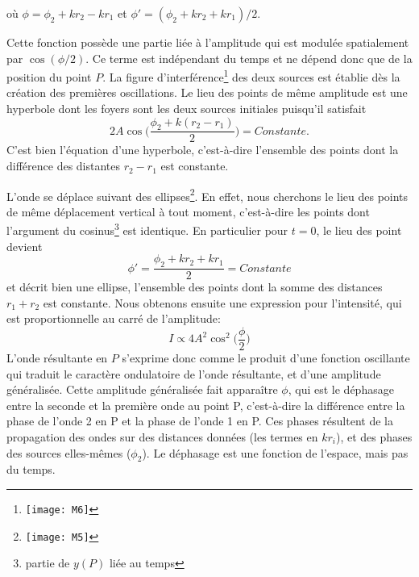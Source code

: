 où $\phi=\phi_2 +kr_2-kr_1$ et $\phi'=(\phi_2 +kr_2+kr_1)/2$.

Cette fonction possède une partie liée à l'amplitude qui est modulée spatialement par $\cos (\phi/2)$. Ce terme est indépendant du temps et ne dépend donc que de la position du point $P$. La figure d'interférence\footnote{
\texttt{[image: M6]}} des deux sources est établie dès la création des premières oscillations.
Le lieu des points de même amplitude est une hyperbole dont les foyers sont les deux sources initiales puisqu'il satisfait
$$2A\cos \Big(\frac{\phi_2 +k(r_2-r_1)}{2}\Big)=Constante.$$
C'est bien l'équation d'une hyperbole, c'est-à-dire l'ensemble des points dont la différence des distantes $r_2-r_1$ est constante.

L'onde se déplace suivant des ellipses\footnote{
\texttt{[image: M5]}}. En effet, nous cherchons le lieu des points de même déplacement vertical à tout moment, c'est-à-dire les points dont l'argument du cosinus\footnote{partie de $y(P)$ liée au temps} est identique.
En particulier pour $t=0$, le lieu des point devient
$$\phi'=\frac{\phi_2 +kr_2+kr_1}{2}=Constante$$ 
et décrit bien une ellipse, l'ensemble des points dont la somme des distances $r_1+r_2$ est constante.
Nous obtenons ensuite une expression pour l'intensité, qui est proportionnelle au carré de l'amplitude:
$$I\propto 4A^2\cos^2 \Big(\frac{\phi}{2}\Big)$$
L'onde résultante en $P$ s'exprime donc comme le produit d'une fonction oscillante qui traduit le caractère ondulatoire de l'onde résultante, et d'une amplitude généralisée. Cette amplitude généralisée fait apparaître $\phi$, qui est le déphasage entre la seconde et la première onde au point P, c'est-à-dire la différence entre la phase de l'onde 2 en P et la phase de l'onde 1 en P. Ces phases résultent de la propagation des ondes sur des distances données (les termes en $kr_i$), et des phases des sources elles-mêmes ($\phi_2$). Le déphasage est une fonction de l'espace, mais pas du temps.

